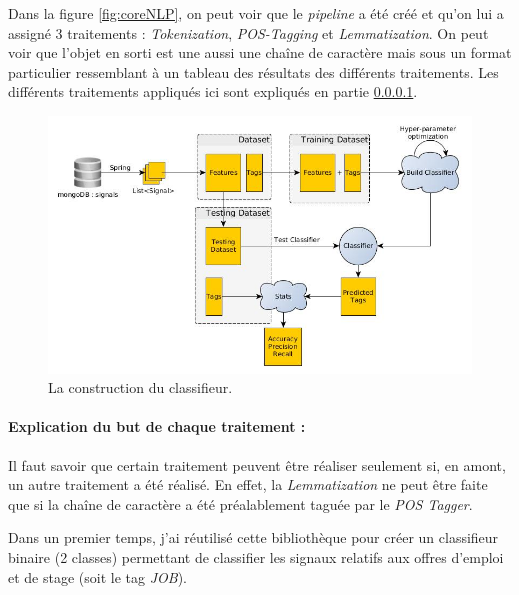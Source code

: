             Dans la figure \ref{fig:coreNLP}, on peut voir que le \textit{pipeline} a été créé et qu'on lui a assigné 3 traitements : \textit{Tokenization}, \textit{POS-Tagging} et \textit{Lemmatization}. On peut voir que l'objet en sorti est une aussi une chaîne de caractère mais sous un format particulier ressemblant à un tableau des résultats des différents traitements. Les différents traitements appliqués ici sont expliqués en partie \ref{}.\\

            \begin{figure}[h!]
                \centering
                \includegraphics[width=\textwidth]{images/classifier_building.jpg}
                \caption{La construction du classifieur.}
                \label{fig:classif_building}
            \end{figure}


            \paragraph{Explication du but de chaque traitement :}
            Il faut savoir que certain traitement peuvent être réaliser seulement si, en amont, un autre traitement a été réalisé. En effet, la \textit{Lemmatization} ne peut être faite que si la chaîne de caractère a été préalablement taguée par le \textit{POS Tagger}.


            Dans un premier temps, j'ai réutilisé cette bibliothèque pour créer un classifieur binaire (2 classes) permettant de classifier les signaux relatifs aux offres d'emploi et de stage (soit le tag \textit{JOB}).

